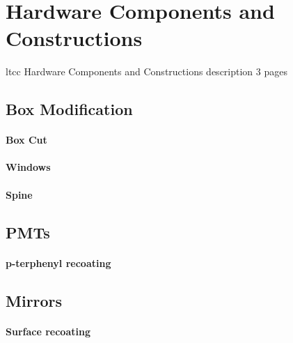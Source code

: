 \section{Hardware Components and Constructions}

ltcc Hardware Components and Constructions description 3 pages

\subsection{Box Modification}
\paragraph{Box Cut}
\paragraph{Windows}
\paragraph{Spine}

\subsection{PMTs}
\paragraph{p-terphenyl recoating}

\subsection{Mirrors}
\paragraph{Surface recoating}
